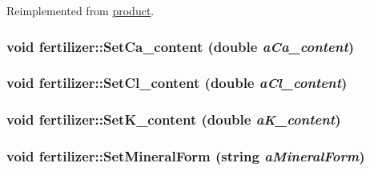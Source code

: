 Reimplemented from \hyperlink{classproduct_a1edb3e3d0619a2db8b8f1c95fed582ce}{product}.\hypertarget{classfertilizer_a63ac67ef24e6587f37a0c54a89c2afb4}{
\subsubsection[{SetCa\_\-content}]{\setlength{\rightskip}{0pt plus 5cm}void fertilizer::SetCa\_\-content (double {\em aCa\_\-content})}}
\label{classfertilizer_a63ac67ef24e6587f37a0c54a89c2afb4}
\hypertarget{classfertilizer_a1aa5f7fc62508c6af74293e912ca2207}{
\subsubsection[{SetCl\_\-content}]{\setlength{\rightskip}{0pt plus 5cm}void fertilizer::SetCl\_\-content (double {\em aCl\_\-content})}}
\label{classfertilizer_a1aa5f7fc62508c6af74293e912ca2207}
\hypertarget{classfertilizer_aba04153f1ef7cd9d8415fd7e75511ea9}{
\subsubsection[{SetK\_\-content}]{\setlength{\rightskip}{0pt plus 5cm}void fertilizer::SetK\_\-content (double {\em aK\_\-content})}}
\label{classfertilizer_aba04153f1ef7cd9d8415fd7e75511ea9}
\hypertarget{classfertilizer_af4bd988ce3875432ddc2014a21476444}{
\subsubsection[{SetMineralForm}]{\setlength{\rightskip}{0pt plus 5cm}void fertilizer::SetMineralForm (string {\em aMineralForm})}}
\label{classfertilizer_af4bd988ce3875432ddc2014a21476444}
